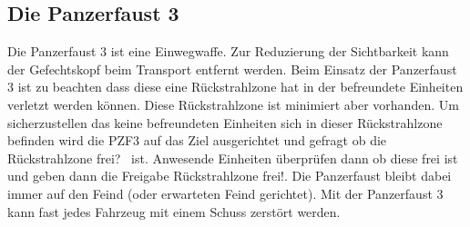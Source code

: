 \subsection{Die Panzerfaust 3}
Die Panzerfaust 3 ist eine Einwegwaffe. Zur Reduzierung der Sichtbarkeit kann der Gefechtskopf beim Transport entfernt werden. Beim Einsatz der Panzerfaust 3 ist zu beachten dass diese eine Rückstrahlzone hat in der befreundete Einheiten verletzt werden können. Diese Rückstrahlzone ist minimiert aber vorhanden. Um sicherzustellen das keine befreundeten Einheiten sich in dieser Rückstrahlzone befinden wird die PZF3 auf das Ziel ausgerichtet und gefragt ob die 
\glqq Rückstrahlzone frei?\grqq ~ ist. Anwesende Einheiten überprüfen dann ob diese frei ist und geben dann die Freigabe \glqq Rückstrahlzone frei!\grqq. Die Panzerfaust bleibt dabei immer auf den Feind (oder erwarteten Feind gerichtet).  Mit der Panzerfaust 3 kann fast jedes Fahrzeug mit einem Schuss zerstört werden. \\

